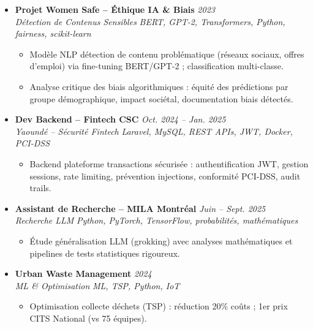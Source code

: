 \documentclass[a4paper,11pt]{article}
\begin{document}
\begin{itemize}[leftmargin=*, label={-}]
    \item \textbf{Projet Women Safe -- \'Ethique IA \& Biais} \hfill \textit{2023} \\
    \textit{D\'etection de Contenus Sensibles} \hfill \textit{BERT, GPT-2, Transformers, Python, fairness, scikit-learn}
    \vspace{-2pt}
    \begin{itemize}[leftmargin=0.4cm, nosep, label=\tiny$\bullet$]
        \item \small{Modèle NLP détection de contenu problématique (réseaux sociaux, offres d'emploi) via fine-tuning BERT/GPT-2 ; classification multi-classe.}
        \item \small{Analyse critique des biais algorithmiques : équité des prédictions par groupe démographique, impact sociétal, documentation biais détectés.}
    \end{itemize}
    \vspace{3pt}

    \item \textbf{Dev Backend -- Fintech CSC} \hfill \textit{Oct. 2024 -- Jan. 2025} \\
    \textit{Yaoundé -- Sécurité Fintech} \hfill \textit{Laravel, MySQL, REST APIs, JWT, Docker, PCI-DSS}
    \vspace{-2pt}
    \begin{itemize}[leftmargin=0.4cm, nosep, label=\tiny$\bullet$]
        \item \small{Backend plateforme transactions sécurisée : authentification JWT, gestion sessions, rate limiting, prévention injections, conformité PCI-DSS, audit trails.}
    \end{itemize}
    \vspace{3pt}

    \item \textbf{Assistant de Recherche -- MILA Montréal} \hfill \textit{Juin -- Sept. 2025} \\
    \textit{Recherche LLM} \hfill \textit{Python, PyTorch, TensorFlow, probabilités, mathématiques}
    \vspace{-2pt}
    \begin{itemize}[leftmargin=0.4cm, nosep, label=\tiny$\bullet$]
        \item \small{Étude généralisation LLM (grokking) avec analyses mathématiques et pipelines de tests statistiques rigoureux.}
    \end{itemize}
    \vspace{3pt}

    \item \textbf{Urban Waste Management} \hfill \textit{2024} \\
    \textit{ML \& Optimisation} \hfill \textit{ML, TSP, Python, IoT}
    \vspace{-2pt}
    \begin{itemize}[leftmargin=0.4cm, nosep, label=\tiny$\bullet$]
        \item \small{Optimisation collecte déchets (TSP) : réduction 20\% coûts ; 1er prix CITS National (vs 75 équipes).}
    \end{itemize}
    \vspace{3pt}


\end{itemize}
\end{document}
